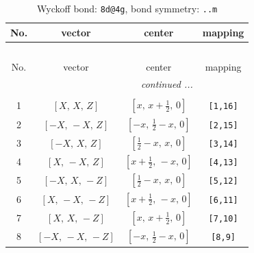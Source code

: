 \documentclass[fleqn,8pt]{jsarticle}
\begin{document}
\begin{longtable}{cccc}
\caption{Wyckoff bond: {\tt 8d@4g}, bond symmetry: {\tt ..m}}
 \\
 \hline \hline
No. & vector & center & mapping \\ \hline \endfirsthead

\multicolumn{3}{l}{\tablename\ \thetable{}} \\
 \hline \hline
No. & vector & center & mapping \\ \hline \endhead

 \hline \hline
\multicolumn{3}{r}{\footnotesize\it continued ...} \\ \endfoot

 \hline \hline
\multicolumn{3}{r}{} \\ \endlastfoot

1 & $\left[ X,\, X,\, Z \right]$ & $\left[ x,\, x + \frac{1}{2},\, 0 \right]$ & {\tt [1,16]} \\ \hline
2 & $\left[ - X,\, - X,\, Z \right]$ & $\left[ - x,\, \frac{1}{2} - x,\, 0 \right]$ & {\tt [2,15]} \\ \hline
3 & $\left[ - X,\, X,\, Z \right]$ & $\left[ \frac{1}{2} - x,\, x,\, 0 \right]$ & {\tt [3,14]} \\ \hline
4 & $\left[ X,\, - X,\, Z \right]$ & $\left[ x + \frac{1}{2},\, - x,\, 0 \right]$ & {\tt [4,13]} \\ \hline
5 & $\left[ - X,\, X,\, - Z \right]$ & $\left[ \frac{1}{2} - x,\, x,\, 0 \right]$ & {\tt [5,12]} \\ \hline
6 & $\left[ X,\, - X,\, - Z \right]$ & $\left[ x + \frac{1}{2},\, - x,\, 0 \right]$ & {\tt [6,11]} \\ \hline
7 & $\left[ X,\, X,\, - Z \right]$ & $\left[ x,\, x + \frac{1}{2},\, 0 \right]$ & {\tt [7,10]} \\ \hline
8 & $\left[ - X,\, - X,\, - Z \right]$ & $\left[ - x,\, \frac{1}{2} - x,\, 0 \right]$ & {\tt [8,9]} \\
\end{longtable}
\renewcommand{\arraystretch}{1.2}
\end{document}
